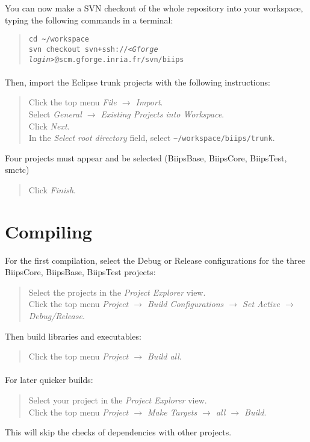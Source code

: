 You can now make a SVN checkout of the whole \biips{} repository into your workspace, typing the following commands in a terminal:
\begin{quote}
\verb=cd ~/workspace= \\
\texttt{svn checkout svn+ssh://\textit{<Gforge login>}@scm.gforge.inria.fr/svn/biips}
\end{quote}


\paragraph{}
Then, import the Eclipse trunk projects with the following instructions:
\begin{quote}
Click the top menu \emph{File $\rightarrow$ Import}. \\
Select \emph{General $\rightarrow$ Existing Projects into Workspace}. \\
Click \emph{Next}. \\
In the \emph{Select root directory} field, select \verb=~/workspace/biips/trunk=.
\end{quote}
Four projects must appear and be selected (BiipsBase, BiipsCore, BiipsTest, smctc)
\begin{quote}
Click \emph{Finish}.
\end{quote}


\section{Compiling}
For the first compilation, select the Debug or Release configurations for the three BiipsCore, BiipsBase, BiipsTest projects:
\begin{quote}
Select the projects in the \emph{Project Explorer} view.\\
Click the top menu \emph{Project $\rightarrow$ Build Configurations $\rightarrow$ Set Active $\rightarrow$ Debug/Release}.
\end{quote}
Then build libraries and executables:
\begin{quote}
Click the top menu \emph{Project $\rightarrow$ Build all}.
\end{quote}

\paragraph{}
For later quicker builds:
\begin{quote}
Select your project in the \emph{Project Explorer} view.\\
Click the top menu \emph{Project $\rightarrow$ Make Targets $\rightarrow$ all $\rightarrow$ Build}.
\end{quote}
This will skip the checks of dependencies with other projects.

